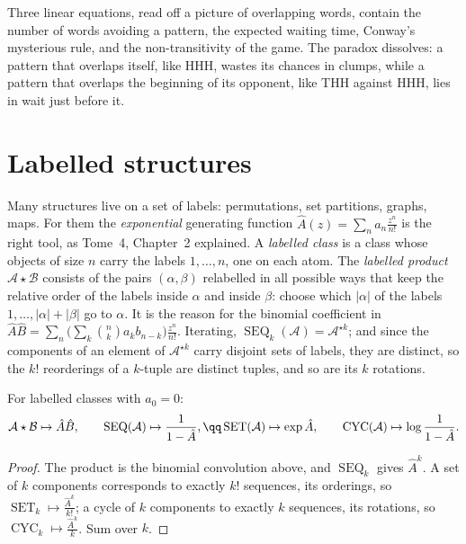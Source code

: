 \begin{beauty}
Three linear equations, read off a picture of overlapping words, contain the number of words avoiding a pattern, the expected
waiting time, Conway's mysterious rule, and the non-transitivity of the game. The paradox dissolves: a pattern that overlaps
itself, like HHH, wastes its chances in clumps, while a pattern that overlaps the beginning of its opponent, like THH against HHH,
lies in wait just before it.
\end{beauty}

\section{Labelled structures}

Many structures live on a set of labels: permutations, set partitions, graphs, maps. For them the \emph{exponential} generating
function $\hat A(z)=\sum_na_n\frac{z^n}{n!}$ is the right tool, as Tome~4, Chapter~2 explained. A \emph{labelled class} is a class whose objects of size $n$
carry the labels $1,\dots,n$, one on each atom. The \emph{labelled product} $\mathcal A\star\mathcal B$ consists of the pairs $(\alpha,\beta)$ relabelled in all possible ways that keep the
relative order of the labels inside $\alpha$ and inside $\beta$: choose which $|\alpha|$ of the labels $1,\dots,|\alpha|+|\beta|$ go to $\alpha$. It is the reason for the binomial
coefficient in $\hat A\hat B=\sum_n\big(\sum_k\binom nka_kb_{n-k}\big)\frac{z^n}{n!}$. Iterating, $\operatorname{SEQ}_k(\mathcal A)=\mathcal A^{\star k}$; and since the components of an element of $\mathcal A^{\star k}$ carry
disjoint sets of labels, they are distinct, so the $k!$ reorderings of a $k$-tuple are distinct tuples, and so are its $k$ rotations.

\begin{theorem}\label{thm:labelled}
For labelled classes with $a_0=0$:
\[
\begin{gathered}
\mathcal A\star\mathcal B\mapsto\hat A\hat B,\qquad \operatorname{SEQ}(\mathcal A)\mapsto\frac1{1-\hat A},\qq \operatorname{SET}(\mathcal A)\mapsto\exp\hat A,\qquad \operatorname{CYC}(\mathcal A)\mapsto\log\frac1{1-\hat A}.
\end{gathered}
\]
\end{theorem}
\begin{proof}
The product is the binomial convolution above, and $\operatorname{SEQ}_k$ gives $\hat A^k$. A set of $k$ components corresponds to exactly $k!$ sequences, its
orderings, so $\operatorname{SET}_k\mapsto\frac{\hat A^k}{k!}$; a cycle of $k$ components to exactly $k$ sequences, its rotations, so $\operatorname{CYC}_k\mapsto\frac{\hat A^k}k$. Sum over $k$.
\end{proof}

